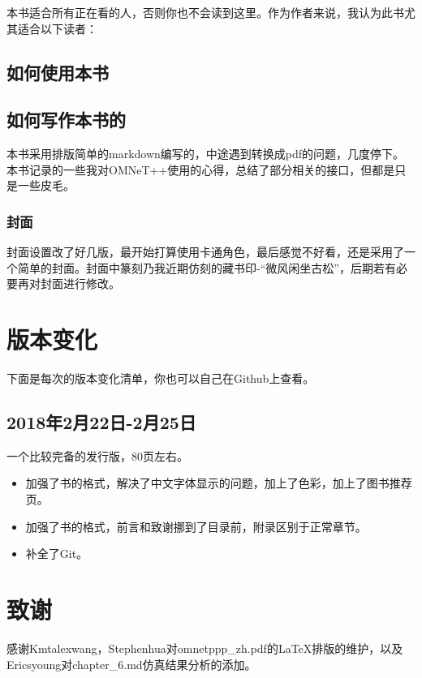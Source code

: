本书适合所有正在看的人，否则你也不会读到这里。作为作者来说，我认为此书尤其适合以下读者：

\section{如何使用本书}
\label{如何使用本书}

\section{如何写作本书的}
\label{如何写作本书的}

本书采用排版简单的markdown编写的，中途遇到转换成pdf的问题，几度停下。本书记录的一些我对OMNeT++使用的心得，总结了部分相关的接口，但都是只是一些皮毛。

\subsection{封面}
\label{封面}

封面设置改了好几版，最开始打算使用卡通角色，最后感觉不好看，还是采用了一个简单的封面。封面中篆刻乃我近期仿刻的藏书印-“微风闲坐古松”，后期若有必要再对封面进行修改。

\chapter{版本变化}
\label{版本变化}

下面是每次的版本变化清单，你也可以自己在Github上查看。

\section{2018年2月22日-2月25日}
\label{2018年2月22日-2月25日}

一个比较完备的发行版，80页左右。

\begin{itemize}
\item 加强了书的格式，解决了中文字体显示的问题，加上了色彩，加上了图书推荐页。

\item 加强了书的格式，前言和致谢挪到了目录前，附录区别于正常章节。

\item 补全了Git。

\end{itemize}

\chapter{致谢}
\label{致谢}

感谢Kmtalexwang，Stephenhua对omnetppp\_zh.pdf的LaTeX排版的维护，以及Ericsyoung对chapter\_6.md仿真结果分析的添加。

